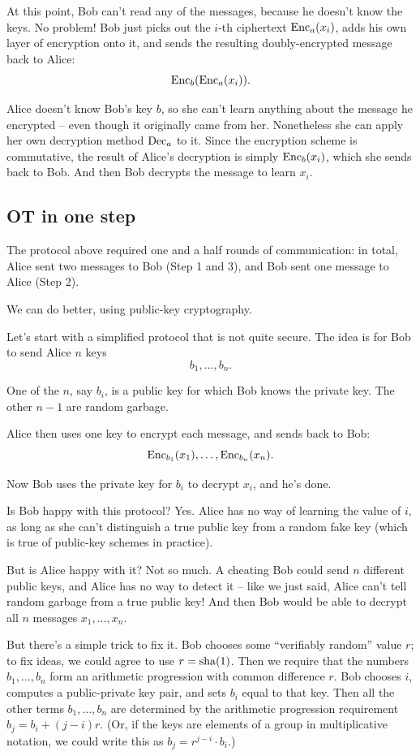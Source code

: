 At this point, Bob can't read any of the messages, because he doesn't
know the keys. No problem! Bob just picks out the $i$-th ciphertext
$\operatorname{Enc}_{a}( x_{i} )$, adds his own layer of
encryption onto it, and sends the resulting doubly-encrypted message
back to Alice:
\[\operatorname{Enc}_{b}( \operatorname{Enc}_{a}( x_{i} ) ).\]

Alice doesn't know Bob's key $b$, so she can't learn anything about
the message he encrypted -- even though it originally came from her.
Nonetheless she can apply her own decryption method
$\operatorname{Dec}_{a}$ to it. Since the encryption scheme is
commutative, the result of Alice's decryption is simply
$\operatorname{Enc}_{b}( x_{i} )$, which she sends back to
Bob.  And then Bob decrypts the message to learn $x_{i}$.

\subsection{OT in one step}

The protocol above required one and a half rounds of communication: in
total, Alice sent two messages to Bob (Step 1 and 3), and Bob sent one
message to Alice (Step 2).

We can do better, using public-key cryptography.

Let's start with a simplified protocol that is not quite secure. The
idea is for Bob to send Alice $n$ keys \[b_{1},\ldots,b_{n}.\]

One of the $n$, say $b_{i}$, is a public key for which Bob knows the
private key. The other $n - 1$ are random garbage.

Alice then uses one key to encrypt each message, and sends back to Bob:
\[\operatorname{Enc}_{b_{1}}( x_{1} ),\ldots,\operatorname{Enc}_{b_{n}}( x_{n} ).\]

Now Bob uses the private key for $b_{i}$ to decrypt $x_{i}$, and he's done.

Is Bob happy with this protocol? Yes. Alice has no way of learning the
value of $i$, as long as she can't distinguish a true public key from
a random fake key (which is true of public-key schemes in practice).

But is Alice happy with it? Not so much. A cheating Bob could send $n$
different public keys, and Alice has no way to detect it -- like we just
said, Alice can't tell random garbage from a true public key! And then
Bob would be able to decrypt all $n$ messages $x_{1},\ldots,x_{n}$.

But there's a simple trick to fix it. Bob chooses some ``verifiably
random'' value $r$; to fix ideas, we could agree to use
$r = \operatorname{sha}(1)$. Then we require that the numbers
$b_{1},\ldots,b_{n}$ form an arithmetic progression with common
difference $r$. Bob chooses $i$, computes a public-private key pair,
and sets $b_{i}$ equal to that key. Then all the other terms
$b_{1},\ldots,b_{n}$ are determined by the arithmetic progression
requirement $b_{j} = b_{i} + (j - i)r$. (Or, if the keys are elements
of a group in multiplicative notation, we could write this as
$b_{j} = r^{j - i} \cdot b_{i}$.)

